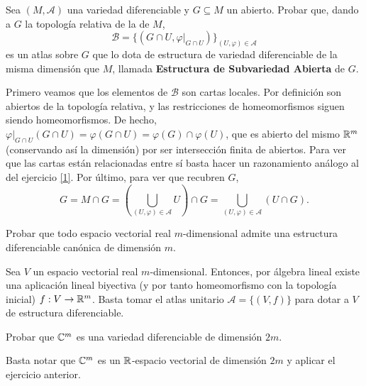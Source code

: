 \documentclass[twoside]{article}
\begin{document}
\begin{ejercicio}{4}
Sea $(M,\mathcal{A})$ una variedad diferenciable y $G\subseteq M$ un abierto. Probar que,
dando a $G$ la topología relativa de la de $M$,
$$\mathcal{B} = \{(G \cap U, \varphi|_{G\cap U})\}_{(U,\varphi)\in\mathcal{A}}$$
es un atlas sobre $G$ que lo dota de estructura de variedad diferenciable de la
misma dimensión que $M$, llamada \textbf{Estructura de Subvariedad Abierta}
de $G$.
\end{ejercicio}
\begin{solucion}
Primero veamos que los elementos de $\mathcal{B}$ son cartas locales. Por definición son abiertos de la topología relativa, y las restricciones de homeomorfismos siguen siendo homeomorfismos. De hecho, $\varphi|_{G\cap U}(G\cap U)=\varphi(G\cap U)=\varphi(G)\cap\varphi(U)$, que es abierto del mismo $\mathbb{R}^m$ (conservando así la dimensión) por ser intersección finita de abiertos. Para ver que las cartas están relacionadas entre sí basta hacer un razonamiento  análogo al del ejercicio \ref{1}. Por último, para ver que recubren $G$, 
$$G=M\cap G=(\bigcup_{(U,\varphi)\in\mathcal{A}}U)\cap G= \bigcup_{(U,\varphi)\in\mathcal{A}}(U\cap G).$$
\end{solucion}

\begin{ejercicio}{5}
Probar que todo espacio vectorial real $m$-dimensional admite una estructura
diferenciable canónica de dimensión $m$.
\end{ejercicio}
\begin{solucion}
Sea $V$ un espacio vectorial real $m$-dimensional. Entonces, por álgebra lineal existe una aplicación lineal biyectiva (y por tanto homeomorfismo con la topología inicial) $f:V\to\mathbb{R}^m$. Basta tomar el atlas unitario $\mathcal{A}=\{(V,f)\}$ para dotar a $V$ de estructura diferenciable.  
\end{solucion}

\begin{ejercicio}{6}
Probar que $\mathbb{C}^m$ es una variedad diferenciable de dimensión $2m$.
\end{ejercicio}
\begin{solucion}
Basta notar que $\mathbb{C}^m$ es un $\mathbb{R}$-espacio vectorial de dimensión $2m$ y aplicar el ejercicio anterior.
\end{solucion}
\end{document}
